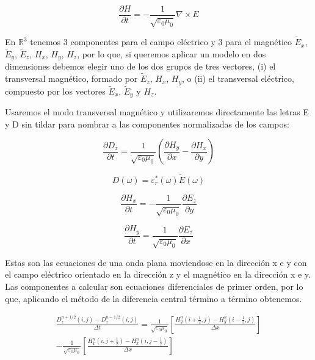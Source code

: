 \documentclass[11pt,a4paper,twoside,pdf]{article}
\numberwithin{equation}{section}
\begin{document}
\begin{equation}
\frac{\partial H}{\partial t}=-\frac{1}{\sqrt{\varepsilon_{0}\mu_{0}}}\nabla \times E
\end{equation}


En $\mathbb R^{3}$ tenemos 3 componentes para el campo eléctrico y 3 para el magnético $\tilde{E}_{x}$, $\tilde{E}_{y}$, $\tilde{E}_{z}$, $H_{x}$, $H_{y}$, $H_{z}$, por lo que, si queremos aplicar un modelo en dos dimensiones debemos elegir uno de los dos grupos de tres vectores, (i) el transversal magnético, formado por $\tilde{E}_{z}$, $H_{x}$, $H_{y}$, o (ii) el transversal eléctrico, compuesto por los vectores $\tilde{E}_{x}$, $\tilde{E}_{y}$ y $H_{z}$.

Usaremos el modo transversal magnético y utilizaremos directamente las letras E y D sin tildar para nombrar a las componentes normalizadas de los campos:

\begin{equation}
\frac{\partial D_{z}}{\partial t}=\frac{1}{\sqrt{\varepsilon_{0}\mu_{0}}}(\frac{\partial H_{y}}{\partial x}-\frac{\partial H_{x}}{\partial y})
\end{equation}

\begin{equation}
{D}(\omega)=\varepsilon^*_{r}(\omega)\tilde{E}(\omega)
\end{equation}

\begin{equation}
\frac{\partial H_{x}}{\partial t}=-\frac{1}{\sqrt{\varepsilon_{0}\mu_{0}}}\frac{\partial E_{z}}{\partial y}
\end{equation}

\begin{equation}
\frac{\partial H_{y}}{\partial t}=\frac{1}{\sqrt{\varepsilon_{0}\mu_{0}}}\frac{\partial E_{z}}{\partial x}
\end{equation}

Estas son las ecuaciones de una onda plana moviendose en la dirección x e y con el campo eléctrico orientado en la dirección z y el magnético en la dirección x e y. Las componentes a calcular son ecuaciones diferenciales de primer orden, por lo que, aplicando el método de la diferencia central término a término obtenemos.

\begin{equation}
\begin{split}
\frac{D^{n+1/2}_{z}(i,j)-D^{n-1/2}_{z}(i,j)}{\Delta t}=\frac{1}{\sqrt{\varepsilon_{0}\mu_{0}}}\left[\frac{H^{n}_{y}(i+\frac{1}{2},j)-H^{n}_{y}(i-\frac{1}{2},j)}{\Delta x}\right]  \\
-\frac{1}{\sqrt{\varepsilon_{0}\mu_{0}}}\left[\frac{H^{n}_{x}(i,j+\frac{1}{2})-H^{n}_{x}(i,j-\frac{1}{2})}{\Delta x}\right] 
\end{split}
\end{equation}
\end{document}
